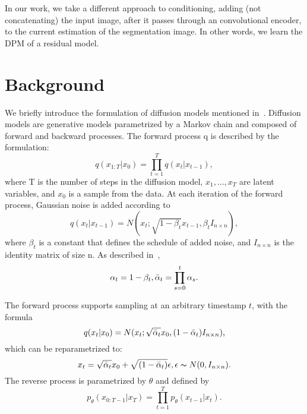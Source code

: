 \documentclass[10pt,twocolumn,letterpaper]{article}
\begin{document}
In our work, we take a different approach to conditioning, adding (not concatenating) the input image, after it passes through an convolutional encoder, to the current estimation of the segmentation image. In other words, we learn the DPM of a residual model.


\section{Background}

We  briefly introduce the formulation of diffusion models mentioned in~\cite{ho2020denoising}.
Diffusion models are generative models parametrized by a Markov chain and composed of forward and backward processes. The forward process q is described by the formulation:
\begin{equation}
    q(x_{1:T}|x_0) 
    = 
    \prod^T_{t=1}q(x_t|x_{t-1}),
\end{equation}
where T is the number of steps in the diffusion model, $x_1, ... , x_T$ are latent variables, and $x_0$ is a sample from the data. At each iteration of the forward process, Gaussian noise is added according to
\begin{equation}
    q(x_t|x_{t-1}) 
    = 
    N(x_t;\sqrt{1-\beta_t}x_{t-1},\beta_t I_{n\times n}),
\end{equation}
where $\beta_t$ is a constant that defines the schedule of added noise, and $I_{n\times n}$ is the identity matrix of size n. As described in~\cite{ho2020denoising}, 
\begin{equation}
    \alpha_t 
    = 
    1-\beta_t, 
    \Bar{\alpha}_t
    = 
    \prod^t_{s=0}\alpha_s.
\end{equation}

The forward process supports sampling at an arbitrary timestamp $t$, with the formula
\begin{equation}
    q(x_t|x_0) 
    = 
    N(x_t;\sqrt{\Bar{\alpha}_t}x_0,(1-\Bar{\alpha}_t)I_{n\times n}),
\end{equation}
which can be reparametrized to:
\begin{equation}
    x_t 
    = 
    \sqrt{\Bar{\alpha}_t}x_0 + \sqrt{(1-\Bar{\alpha}_t)} \epsilon, \epsilon \thicksim N(0,I_{n\times n}).
\label{eq:xt_reparametrization}
\end{equation}
The reverse process is parametrized by $\theta$ and defined by
\begin{equation}
    p_\theta(x_{0:T-1}|x_T) 
    = 
    \prod^T_{t=1}p_\theta(x_{t-1}|x_t).
\end{equation}
\end{document}
